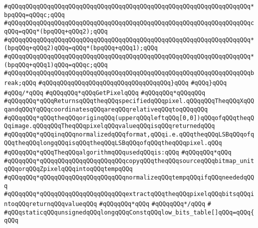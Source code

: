 \verb|#qQQqqQQqqQQqqQQqqQQqqQQqqQQqqQQqqQQqqQQqqQQqqQQqqQQqqQQqqQQqqQQqqQQq*bpqQQq=qQQqc;qQQq|\newline
\verb|#qQQqqQQqqQQqqQQqqQQqqQQqqQQqqQQqqQQqqQQqqQQqqQQqqQQqqQQqqQQqqQQqqQQqcqQQq=qQQq*(bpqQQq+qQQq2);qQQq|\newline
\verb|#qQQqqQQqqQQqqQQqqQQqqQQqqQQqqQQqqQQqqQQqqQQqqQQqqQQqqQQqqQQqqQQqqQQq*(bpqQQq+qQQq2)qQQq=qQQq*(bpqQQq+qQQq1);qQQq|\newline
\verb|#qQQqqQQqqQQqqQQqqQQqqQQqqQQqqQQqqQQqqQQqqQQqqQQqqQQqqQQqqQQqqQQqqQQq*(bpqQQq+qQQq1)qQQq=qQQqc;qQQq|\newline
\verb|#qQQqqQQqqQQqqQQqqQQqqQQqqQQqqQQqqQQqqQQqqQQqqQQqqQQqqQQqqQQqqQQqqQQqbreak;qQQq|\newline
\verb|#qQQqqQQqqQQqqQQqqQQqqQQqqQQqqQQqqQQq}qQQq|\newline
\verb|#qQQq}qQQq|\newline
\newline
\verb|#qQQq/*qQQq|\newline
\verb|#qQQqqQQq*qQQqGetPixelqQQq|\newline
\verb|#qQQqqQQq*qQQqqQQq|\newline
\verb|#qQQqqQQq*qQQqReturnsqQQqtheqQQqspecifiedqQQqpixel.qQQqqQQqTheqQQqXqQQqandqQQqYqQQqcoordinatesqQQqareqQQqrelativeqQQqtoqQQqqQQq|\newline
\verb|#qQQqqQQq*qQQqtheqQQqoriginqQQq(upperqQQqleftqQQq[0,0])qQQqofqQQqtheqQQqimage.qQQqqQQqTheqQQqpixelqQQqvalueqQQqisqQQqreturnedqQQq|\newline
\verb|#qQQqqQQq*qQQqinqQQqnormalizedqQQqformat,qQQqi.e.qQQqtheqQQqLSBqQQqofqQQqtheqQQqlongqQQqisqQQqtheqQQqLSBqQQqofqQQqtheqQQqpixel.qQQq|\newline
\verb|#qQQqqQQq*qQQqTheqQQqalgorithmqQQqusedqQQqis:qQQq|\newline
\verb|#qQQqqQQq*qQQq|\newline
\verb|#qQQqqQQq*qQQqqQQqqQQqqQQqqQQqqQQqcopyqQQqtheqQQqsourceqQQqbitmap_unitqQQqorqQQqZpixelqQQqintoqQQqtempqQQq|\newline
\verb|#qQQqqQQq*qQQqqQQqqQQqqQQqqQQqqQQqnormalizeqQQqtempqQQqifqQQqneededqQQq|\newline
\verb|#qQQqqQQq*qQQqqQQqqQQqqQQqqQQqqQQqextractqQQqtheqQQqpixelqQQqbitsqQQqintoqQQqreturnqQQqvalueqQQq|\newline
\verb|#qQQqqQQq*qQQq|\newline
\verb|#qQQqqQQq*/qQQq|\newline
\verb|#|\newline
\verb|#qQQqstaticqQQqunsignedqQQqlongqQQqConstqQQqlow_bits_table[]qQQq=qQQq{qQQq|\newline
